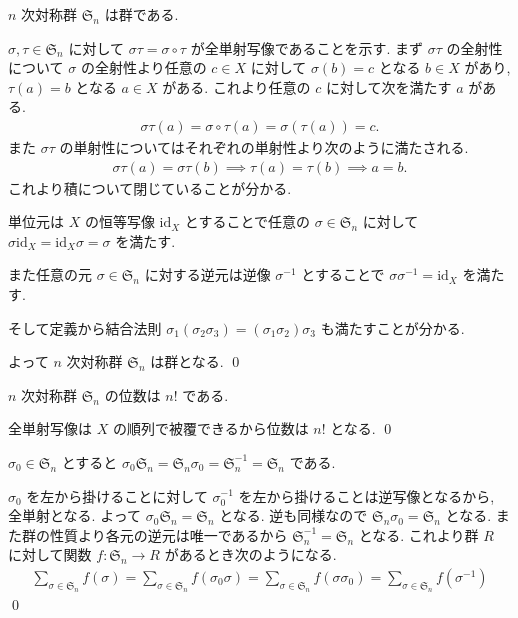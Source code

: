 \documentclass[uplatex,dvipdfmx,a4paper,11pt]{jlreq}
\makeatletter
\renewcommand{\SS}{\mathfrak{S}}
\newcommand{\id}{\mathrm{id}}
\numberwithin{equation}{section}
\theoremstyle{definition}
\renewenvironment{proof}[1][\proofname]{\par
  \normalfont
  \topsep6\p@\@plus6\p@ \trivlist
  \item[\hskip\labelsep{\bfseries #1}\@addpunct{\bfseries}]\ignorespaces\quad\par
}{%
  \qed\endtrivlist\@endpefalse
}
\renewcommand\proofname{証明}
\makeatother
\begin{document}
\begin{theorem}[Q21-3(i)(ii)(iii)(iv)]
  $n$ 次対称群 $\SS_n$ は群である.
\end{theorem}
\begin{proof}
  $\sigma,\tau\in\SS_n$ に対して $\sigma\tau = \sigma\circ\tau$ が全単射写像であることを示す.
  まず $\sigma\tau$ の全射性について $\sigma$ の全射性より任意の $c\in X$ に対して $\sigma(b) = c$ となる $b\in X$ があり, $\tau(a) = b$ となる $a\in X$ がある.
  これより任意の $c$ に対して次を満たす $a$ がある.
  \begin{align}
    \sigma\tau(a) = \sigma\circ\tau(a) = \sigma(\tau(a)) = c.
  \end{align}
  また $\sigma\tau$ の単射性についてはそれぞれの単射性より次のように満たされる.
  \begin{align}
    \sigma\tau(a) = \sigma\tau(b) \implies \tau(a) = \tau(b) \implies a = b.
  \end{align}
  これより積について閉じていることが分かる.

  単位元は $X$ の恒等写像 $\id_X$ とすることで任意の $\sigma\in\SS_n$ に対して $\sigma\id_X = \id_X\sigma = \sigma$ を満たす.

  また任意の元 $\sigma\in\SS_n$ に対する逆元は逆像 $\sigma^{-1}$ とすることで $\sigma\sigma^{-1} = \id_X$ を満たす.

  そして定義から結合法則 $\sigma_1(\sigma_2\sigma_3) = (\sigma_1\sigma_2)\sigma_3$ も満たすことが分かる.

  よって $n$ 次対称群 $\SS_n$ は群となる.
\end{proof}

\begin{proposition}[Q21-4]
  $n$ 次対称群 $\SS_n$ の位数は $n!$ である.
\end{proposition}
\begin{proof}
  全単射写像は $X$ の順列で被覆できるから位数は $n!$ となる.
\end{proof}

\begin{proposition}[Q21-5(i)(ii), Q21-6(i)(ii)]
  $\sigma_0\in\SS_n$ とすると $\sigma_0\SS_n = \SS_n\sigma_0 = \SS_n^{-1} = \SS_n$ である.
\end{proposition}
\begin{proof}
  $\sigma_0$ を左から掛けることに対して $\sigma_0^{-1}$ を左から掛けることは逆写像となるから, 全単射となる. よって $\sigma_0\SS_n = \SS_n$ となる. 逆も同様なので $\SS_n\sigma_0 = \SS_n$ となる.
  また群の性質より各元の逆元は唯一であるから $\SS_n^{-1} = \SS_n$ となる.
  これより群 $R$ に対して関数 $f:\SS_n\to R$ があるとき次のようになる.
  \begin{align}
    \sum_{\sigma\in\SS_n}f(\sigma) = \sum_{\sigma\in\SS_n}f(\sigma_0\sigma) = \sum_{\sigma\in\SS_n}f(\sigma\sigma_0) = \sum_{\sigma\in\SS_n}f(\sigma^{-1})
  \end{align}
\end{proof}
\end{document}

